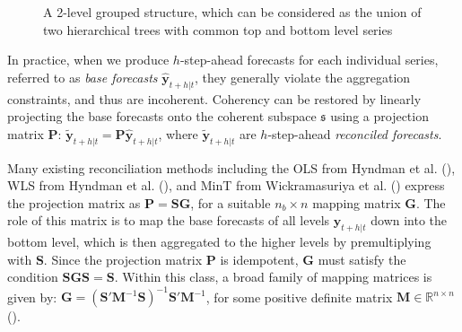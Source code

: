 \documentclass[
  11pt,
  letterpaper,
  DIV=11,
  numbers=noendperiod,
  titlepage]{scrartcl}
\begin{document}
\begin{figure}


\caption{\label{fig-grouped}A 2-level grouped structure, which can be
considered as the union of two hierarchical trees with common top and
bottom level series}

\end{figure}%

In practice, when we produce \(h\)-step-ahead forecasts for each
individual series, referred to as \emph{base forecasts}
\(\hat{\boldsymbol{y}}_{t+h|t}\), they generally violate the aggregation
constraints, and thus are incoherent. Coherency can be restored by
linearly projecting the base forecasts onto the coherent subspace
\(\mathfrak{s}\) using a projection matrix \(\boldsymbol{P}\):
\(\tilde{\boldsymbol{y}}_{t+h|t} = \boldsymbol{P} \hat{\boldsymbol{y}}_{t+h|t}\),
where \(\tilde{\boldsymbol{y}}_{t+h|t}\) are \(h\)-step-ahead
\emph{reconciled forecasts}.

Many existing reconciliation methods including the OLS from Hyndman et
al. (), WLS from Hyndman et al.
(), and MinT from Wickramasuriya et
al. () express the projection
matrix as \(\boldsymbol{P} = \boldsymbol{S} \boldsymbol{G}\), for a
suitable \(n_b \times n\) mapping matrix \(\boldsymbol{G}\). The role of
this matrix is to map the base forecasts of all levels
\(\hat{\boldsymbol{y}}_{t+h|t}\) down into the bottom level, which is
then aggregated to the higher levels by premultiplying with
\(\boldsymbol{S}\). Since the projection matrix \(\boldsymbol{P}\) is
idempotent, \(\boldsymbol{G}\) must satisfy the condition
\(\boldsymbol{S} \boldsymbol{G} \boldsymbol{S} = \boldsymbol{S}\).
Within this class, a broad family of mapping matrices is given by:
\(\boldsymbol{G} = (\boldsymbol{S}' \boldsymbol{M}^{-1} \boldsymbol{S})^{-1} \boldsymbol{S}' \boldsymbol{M}^{-1}\),
for some positive definite matrix
\(\boldsymbol{M} \in \mathbb{R}^{n \times n}\)
().
\end{document}
